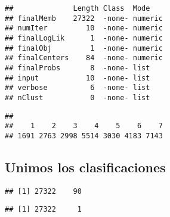 \documentclass[11pt,]{article}
\newenvironment{Shaded}{\begin{snugshade}}{\end{snugshade}}
\newcommand{\KeywordTok}[1]{\textcolor[rgb]{0.13,0.29,0.53}{\textbf{#1}}}
\newcommand{\DecValTok}[1]{\textcolor[rgb]{0.00,0.00,0.81}{#1}}
\newcommand{\StringTok}[1]{\textcolor[rgb]{0.31,0.60,0.02}{#1}}
\newcommand{\OperatorTok}[1]{\textcolor[rgb]{0.81,0.36,0.00}{\textbf{#1}}}
\newcommand{\NormalTok}[1]{#1}
\begin{document}
\begin{verbatim}
##              Length Class  Mode   
## finalMemb    27322  -none- numeric
## numIter         10  -none- numeric
## finalLogLik      1  -none- numeric
## finalObj         1  -none- numeric
## finalCenters    84  -none- numeric
## finalProbs       8  -none- list   
## input           10  -none- list   
## verbose          6  -none- list   
## nClust           0  -none- list
\end{verbatim}

\begin{Shaded}
\end{Shaded}

\begin{verbatim}
## 
##    1    2    3    4    5    6    7 
## 1691 2763 2998 5514 3030 4183 7143
\end{verbatim}

\subsection{Unimos los
clasificaciones}\label{unimos-los-clasificaciones-1}

\begin{Shaded}
\end{Shaded}

\begin{verbatim}
## [1] 27322    90
\end{verbatim}

\begin{Shaded}
\end{Shaded}

\begin{verbatim}
## [1] 27322     1
\end{verbatim}
\end{document}
